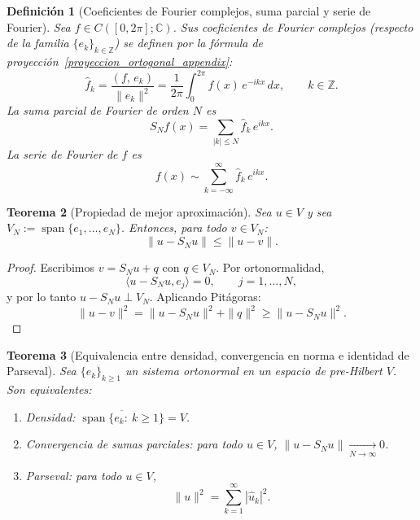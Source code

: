 \documentclass[a4paper,11pt]{report}
\newtheorem{theorem}{Teorema}[chapter]
\newtheorem{definition}[theorem]{Definición}
\begin{document}
\begin{definition}[Coeficientes de Fourier complejos, suma parcial y serie de Fourier]\label{def:fourier_compleja}
Sea $f\in C([0,2\pi];\mathbb{C})$. Sus coeficientes de Fourier complejos (respecto de la familia $\{e_k\}_{k\in\mathbb{Z}}$) se definen por la fórmula de proyección~\eqref{proyeccion_ortogonal_appendix}:
\begin{equation}\label{coef_fourier_complex}
\hat{f}_k = \frac{(f,\,e_k)}{\|e_k\|^2}
= \frac{1}{2\pi}\int_0^{2\pi}f(x)\,e^{-ikx}\,dx,\qquad k\in\mathbb{Z}.
\end{equation}
La suma parcial de Fourier de orden $N$ es
\[
S_Nf(x)=\sum_{|k|\le N}\hat f_k\,e^{ikx}.
\]
La serie de Fourier de $f$ es
\begin{equation}\label{serie_fourier_complex}
f(x)\sim\sum_{k=-\infty}^{\infty}\hat f_k\,e^{ikx}.
\end{equation}
\end{definition}


\begin{theorem}[Propiedad de mejor aproximación]\label{thm:mejor_aprox}
Sea $u\in V$ y sea $V_N:=\operatorname{span}\{e_1,\dots,e_N\}$. Entonces, para todo $v\in V_N$:
\[
\|u-S_Nu\|\le \|u-v\|.
\]
\end{theorem}

\begin{proof}
Escribimos $v=S_Nu+q$ con $q\in V_N$. Por ortonormalidad,
\[
\langle u-S_Nu,e_j\rangle=0,\qquad j=1,\dots,N,
\]
y por lo tanto $u-S_Nu\perp V_N$. Aplicando Pitágoras:
\[
\|u-v\|^2=\|u-S_Nu\|^2+\|q\|^2\ge \|u-S_Nu\|^2.
\]
\end{proof}


\begin{theorem}[Equivalencia entre densidad, convergencia en norma e identidad de Parseval]\label{thm:equiv_densidad_parseval_general}
Sea $\{e_k\}_{k\ge 1}$ un sistema ortonormal en un espacio de pre-Hilbert $V$. Son equivalentes:
\begin{enumerate}
\item Densidad: $\overline{\operatorname{span}\{e_k:\ k\ge1\}}=V$.
\item Convergencia de sumas parciales: para todo $u\in V$, $\|u-S_Nu\|\xrightarrow[N\to\infty]{}0$.
\item Parseval: para todo $u\in V$, \[\|u\|^2=\sum_{k=1}^{\infty}|\widehat u_k|^2.\]
\end{enumerate}
\end{theorem}
\end{document}
